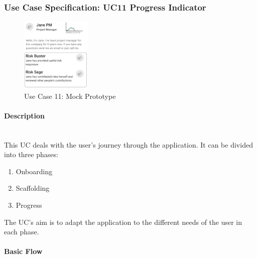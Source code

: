 
\newpage
\subsubsection{Use Case Specification: \ac{UC}11 Progress Indicator}
\label{sec:domainBbl}
\begin{figure}
	\includegraphics[width=0.3\textwidth]{Assets/UC_Screenshots/UC11S.png}
	\caption{Use Case 11: Mock Prototype}
	\label{fig:useCase11Detail}
\end{figure}

\paragraph*{Description}\mbox{}\\
This \ac{UC} deals with the user's journey through the application. 
It can be divided into three phases:
\begin{enumerate}
	\vspace{-3mm}
	\setlength\itemsep{-1em}
	
	\item Onboarding
	\item Scaffolding
	\item Progress
\end{enumerate}
\noindent
The \ac{UC}'s aim is to adapt the application to the different needs of the user in each phase.
\\
\paragraph*{Basic Flow} \mbox{}\\

